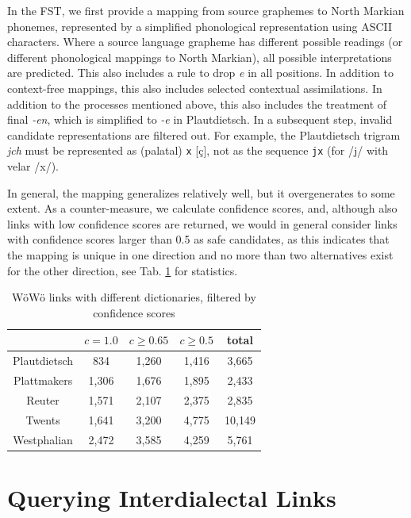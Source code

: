 \documentclass[11pt]{article}
\newcommand{\word}[1]{\textsl{#1}} %
\newcommand{\code}[1]{\texttt{#1}} %
\begin{document}
\begin{enumerate}
In the FST, we first provide a mapping from source graphemes to North Markian phonemes, represented by a simplified phonological representation using ASCII characters. Where a source language grapheme has different possible readings (or different phonological mappings to North Markian), all possible interpretations are predicted. This also includes a rule to drop \word{e} in all positions. In addition to context-free mappings, this also includes selected contextual assimilations. In addition to the processes mentioned above, this also includes the treatment of final \word{-en}, which is simplified to \word{-e} in Plautdietsch. In a subsequent step, invalid candidate representations are filtered out. For example, the Plautdietsch trigram \word{jch} must be represented as (palatal) \code{x} [ç], not as the sequence \code{jx} (for /j/ with velar /x/).

In general, the mapping generalizes relatively well, but it overgenerates to some extent. As a counter-measure, we calculate confidence scores, and, although also links with low confidence scores are returned, we would in general consider links with confidence scores larger than 0.5 as safe candidates, as this indicates that the mapping is unique in one direction and no more than two alternatives exist for the other direction, see Tab. \ref{tab-results} for statistics.



\begin{table}
{\small
\begin{tabular}{ccccc}
                & $c=1.0$   & $c\geq 0.65$  & $c \geq 0.5$  & total \\ \hline
Plautdietsch    & 834       & 1,260          & 1,416          & 3,665 \\
Plattmakers     & 1,306     & 1,676          & 1,895          & 2,433 \\
Reuter          & 1,571     & 2,107          & 2,375          & 2,835 \\
Twents          & 1,641     & 3,200          & 4,775          & 10,149\\
Westphalian     & 2,472     & 3,585          & 4,259          & 5,761 \\
\hline
\end{tabular}
} %
\caption{WöWö links with different dictionaries, filtered by confidence scores}
\label{tab-results}
\end{table}

\section{Querying Interdialectal Links}


\end{enumerate}
\end{document}
